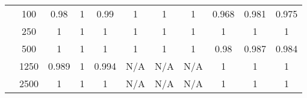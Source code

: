 \begin{table*}[]
{\begin{tabular}{ccccccccccc}
			\multicolumn{1}{|c|}{}                                            & \multicolumn{1}{c|}{100}           & \multicolumn{1}{c|}{0.98}                    & \multicolumn{1}{c|}{1}                    & \multicolumn{1}{c|}{0.99}                 & \multicolumn{1}{c|}{1}                        & \multicolumn{1}{c|}{1}                     & \multicolumn{1}{c|}{1}                 & \multicolumn{1}{c|}{0.968}                  & \multicolumn{1}{c|}{0.981}               & \multicolumn{1}{c|}{0.975}           \\ \cline{2-11}
			\multicolumn{1}{|c|}{}                                            & \multicolumn{1}{c|}{250}           & \multicolumn{1}{c|}{1}                       & \multicolumn{1}{c|}{1}                    & \multicolumn{1}{c|}{1}                 & \multicolumn{1}{c|}{1}                        & \multicolumn{1}{c|}{1}                     & \multicolumn{1}{c|}{1}                 & \multicolumn{1}{c|}{1}                      & \multicolumn{1}{c|}{1}                   & \multicolumn{1}{c|}{1}               \\ \cline{2-11}
			\multicolumn{1}{|c|}{}                                            & \multicolumn{1}{c|}{500}           & \multicolumn{1}{c|}{1}                       & \multicolumn{1}{c|}{1}                    & \multicolumn{1}{c|}{1}                 & \multicolumn{1}{c|}{1}                        & \multicolumn{1}{c|}{1}                     & \multicolumn{1}{c|}{1}                 & \multicolumn{1}{c|}{0.98}                   & \multicolumn{1}{c|}{0.987}               & \multicolumn{1}{c|}{0.984}           \\ \cline{2-11}
			\multicolumn{1}{|c|}{}                                            & \multicolumn{1}{c|}{1250}          & \multicolumn{1}{c|}{0.989}                   & \multicolumn{1}{c|}{1}                    & \multicolumn{1}{c|}{0.994}                 & \multicolumn{1}{c|}{N/A}                      & \multicolumn{1}{c|}{N/A}                   & \multicolumn{1}{c|}{N/A}               & \multicolumn{1}{c|}{1}                      & \multicolumn{1}{c|}{1}                   & \multicolumn{1}{c|}{1}               \\ \cline{2-11}
			\multicolumn{1}{|c|}{}                                            & \multicolumn{1}{c|}{2500}          & \multicolumn{1}{c|}{1}                       & \multicolumn{1}{c|}{1}                    & \multicolumn{1}{c|}{1}                 & \multicolumn{1}{c|}{N/A}                      & \multicolumn{1}{c|}{N/A}                   & \multicolumn{1}{c|}{N/A}               & \multicolumn{1}{c|}{1}                      & \multicolumn{1}{c|}{1}                   & \multicolumn{1}{c|}{1}               \\ \hline

\end{tabular}}
\end{table*}

